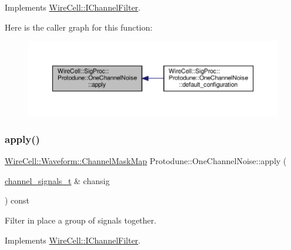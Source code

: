 Implements \hyperlink{class_wire_cell_1_1_i_channel_filter_a6981186ee38a4b9b66e16c0d9b376b08}{Wire\+Cell\+::\+I\+Channel\+Filter}.

Here is the caller graph for this function\+:
\nopagebreak
\begin{figure}[H]
\begin{center}
\leavevmode
\includegraphics[width=350pt]{class_wire_cell_1_1_sig_proc_1_1_protodune_1_1_one_channel_noise_a7d891c87a8867d57fc4b6ac86d226876_icgraph}
\end{center}
\end{figure}
\mbox{\label{class_wire_cell_1_1_sig_proc_1_1_protodune_1_1_one_channel_noise_ae4c1803fb4849e5a9e73f65d79fdc909}} 
\subsubsection{\texorpdfstring{apply()}{apply()}\hspace{0.1cm}{\footnotesize\ttfamily [2/2]}}
{\footnotesize\ttfamily \hyperlink{namespace_wire_cell_1_1_waveform_a18b9ae61c858e340252ba3ac83ac3bc0}{Wire\+Cell\+::\+Waveform\+::\+Channel\+Mask\+Map} Protodune\+::\+One\+Channel\+Noise\+::apply (\begin{DoxyParamCaption}\item[{\hyperlink{class_wire_cell_1_1_i_channel_filter_a44de35ce47701d84cd45393c6bcd5e2f}{channel\+\_\+signals\+\_\+t} \&}]{chansig }\end{DoxyParamCaption}) const\hspace{0.3cm}{\ttfamily [virtual]}}

Filter in place a group of signals together. 

Implements \hyperlink{class_wire_cell_1_1_i_channel_filter_a47554d77b1dca5596dc61e2221e0a137}{Wire\+Cell\+::\+I\+Channel\+Filter}.



